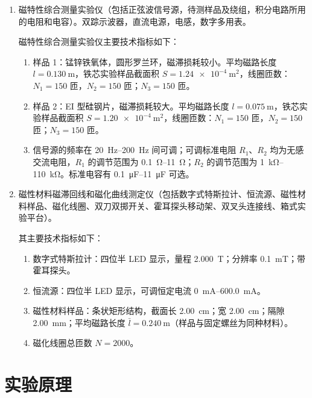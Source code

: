 \documentclass[11pt]{article}
\begin{document}
\begin{enumerate}
    \item 磁特性综合测量实验仪（包括正弦波信号源，待测样品及绕组，积分电路所用的电阻和电容）。双踪示波器，直流电源，电感，数字多用表。
    
    磁特性综合测量实验仪主要技术指标如下：
    \begin{enumerate}[label=\arabic*)]
        \item 样品 1：锰锌铁氧体，圆形罗兰环，磁滞损耗较小。平均磁路长度 $l=\SI{0.130}{\meter}$，铁芯实验样品截面积 $S=\SI{1.24e-4}{\meter\squared}$，线圈匝数：$N_1=150$ 匝，$N_2=150$ 匝；$N_3=150$ 匝。
        \item 样品 2：EI 型硅钢片，磁滞损耗较大。平均磁路长度 $l=\SI{0.075}{\meter}$，铁芯实验样品截面积 $S=\SI{1.20e-4}{\meter\squared}$，线圈匝数：$N_1=150$ 匝，$N_2=150$ 匝；$N_3=150$ 匝。
        \item 信号源的频率在 \SIrange{20}{200}{\hertz} 间可调；可调标准电阻 $R_1$、$R_2$ 均为无感交流电阻，$R_1$ 的调节范围为 \SIrange{0.1}{11}{\ohm}；$R_2$ 的调节范围为 \SIrange{1}{110}{\kilo\ohm}。标准电容有 \SIrange{0.1}{11}{\micro\farad} 可选。
    \end{enumerate}

    \item 磁性材料磁滞回线和磁化曲线测定仪（包括数字式特斯拉计、恒流源、磁性材料样品、磁化线圈、双刀双掷开关、霍耳探头移动架、双叉头连接线、箱式实验平台）。
    
    其主要技术指标如下：
    \begin{enumerate}[label=\arabic*)]
        \item 数字式特斯拉计：四位半 LED 显示，量程 \SI{2.000}{\tesla}；分辨率 \SI{0.1}{\milli\tesla}；带霍耳探头。
        \item 恒流源：四位半 LED 显示，可调恒定电流 \SIrange{0}{600.0}{\milli\ampere}。
        \item 磁性材料样品：条状矩形结构，截面长 \SI{2.00}{\centi\meter}；宽 \SI{2.00}{\centi\meter}；隔隙 \SI{2.00}{\milli\meter}；平均磁路长度 $\bar{l}=\SI{0.240}{\meter}$（样品与固定螺丝为同种材料）。
        \item 磁化线圈总匝数 $N=2000$。
    \end{enumerate}
\end{enumerate}

\section{实验原理}
\label{sec:principles}
\end{document}
